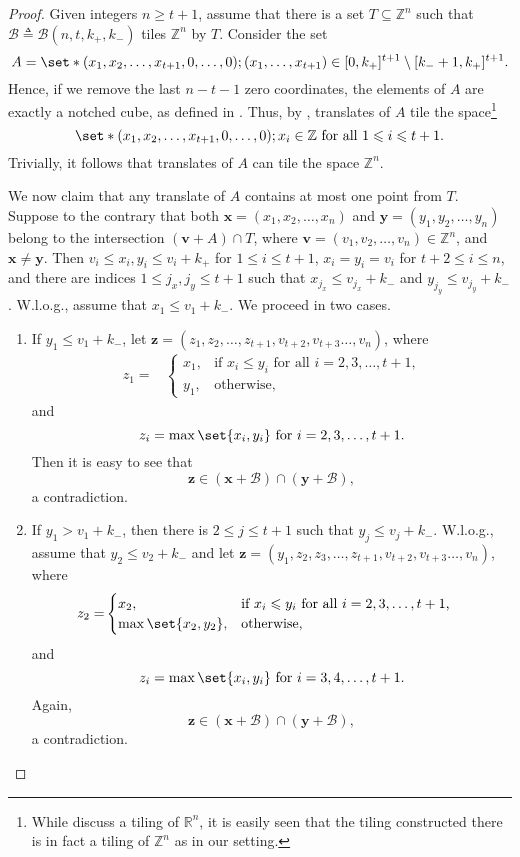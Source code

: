 \documentclass[sort&compress]{elsarticle}
\newcommand{\cB}{\mathcal{B}}
\renewcommand{\leq}{\leqslant}
\renewcommand{\geq}{\geqslant}
\newcommand{\R}{\mathbb{R}}
\newcommand{\Z}{\mathbb{Z}}
\newcommand{\vv}{\mathbf{v}}
\newcommand{\vx}{\mathbf{x}}
\newcommand{\vy}{\mathbf{y}}
\newcommand{\vz}{\mathbf{z}}
\newcommand{\kp}{k_+}
\newcommand{\km}{k_-}
\newcommand{\eqdef}{\triangleq}
\begin{document}
\begin{proof}
Given integers $n\geq t+1$, assume that there is a set $T \subseteq
\Z^n$ such that $\cB\eqdef\cB(n,t,\kp,\km)$ tiles $\Z^n$ by $T$. Consider the
set
\[
A=\set*{(x_1,x_2,\ldots,x_{t+1},  0, \ldots, 0) ; (x_1,\dots,x_{t+1})\in [0,\kp]^{t+1}\setminus [\km+1,\kp]^{t+1} }. 
\]
Hence, if we remove the last $n-t-1$ zero coordinates, the elements of
$A$ are exactly a notched cube, as defined in
\cite{Ste90,BuzEtz12}. Thus, by \cite{Ste90,BuzEtz12}, translates of
$A$ tile the space\footnote{While \cite{Ste90,BuzEtz12} discuss a
  tiling of $\R^n$, it is easily seen that the tiling constructed
  there is in fact a tiling of $\Z^n$ as in our setting.}
\[\set*{(x_1,x_2,\ldots,x_{t+1},  0, \ldots, 0) ;  x_i  \in \Z   \text{\ for all }  1\leq i \leq t+1 } .\]
Trivially, it follows that translates of $A$ can tile the space
$\Z^n$.

We now claim that any translate of $A$ contains at most one point from
$T$.  Suppose to the contrary that both $\vx=(x_1,x_2,\ldots,x_n)$ and
$\vy=(y_1,y_2, \ldots, y_n)$ belong to the intersection $(\vv+A) \cap
T$, where $\vv=(v_1,v_2,\ldots,v_n)\in\Z^n$, and $\vx\neq\vy$. Then
$v_i\leq x_i,y_i \leq v_i + \kp$ for $1\leq i \leq t+1$, $x_i=y_i=v_i$
for $t+2 \leq i \leq n$, and there are indices $1\leq j_x, j_y \leq
t+1$ such that $x_{j_x} \leq v_{j_x} +\km$ and $y_{j_y} \leq
v_{j_y}+\km$. W.l.o.g., assume that $x_1\leq v_1+\km$. We proceed in
two cases.
\begin{enumerate}
\item If $y_1\leq v_1+\km$, let $\vz=(z_1,z_2,\ldots,z_{t+1},v_{t+2},v_{t+3}\ldots,v_n)$, where
\begin{equation*}
\begin{split}
  z_1 = & \begin{cases}
    x_1, & \text{if $x_i\leq y_i$ for all $i=2,3,\ldots,t+1$,} \\
    y_1, & \text{otherwise,}
\end{cases}
\end{split}
\end{equation*}
and
\[z_i=\max\set{x_i,y_i} \text{\ for } i=2,3,\ldots, t+1.\] 
Then it is easy to see that
\[ \vz\in (\vx+\cB)\cap (\vy+\cB),\]
a contradiction.
\item If $y_1> v_1+ \km$, then there is $2\leq j \leq t+1$ such that
  $y_j\leq v_j+\km$. W.l.o.g., assume that $y_2\leq v_2+ \km$ and let
  $\vz=(y_1,z_2,z_3,\ldots,z_{t+1},v_{t+2},v_{t+3}\ldots,v_n)$, where
\begin{equation*}
\begin{split}
  z_2 = & \begin{cases}
    x_2, & \text{if $x_i\leq y_i$ for all $i=2,3,\ldots,t+1$,} \\
    \max\set{x_2,y_2}, &\text{otherwise,}
\end{cases}
\end{split}
\end{equation*}
and
\[z_i=\max\set{x_i,y_i} \text{\ for } i=3,4,\ldots, t+1.\] 
Again,
\[ \vz\in (\vx+\cB)\cap (\vy+\cB),\]
a contradiction.
\end{enumerate}


\end{proof}
\end{document}
